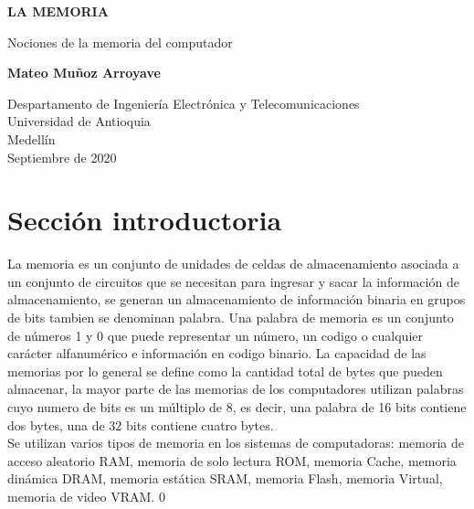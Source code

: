 \documentclass{article}
\begin{document}
\begin{titlepage}
    \begin{center}
        \vspace*{1cm}
            
        \Huge
        \textbf{LA MEMORIA }
            
        \vspace{0.5cm}
        \LARGE
        Nociones de la memoria del computador
            
        \vspace{1.5cm}
            
        \textbf{Mateo Muñoz Arroyave }
            
        \vfill
            
        \vspace{0.8cm}
            
        \Large
        Despartamento de Ingeniería Electrónica y Telecomunicaciones\\
        Universidad de Antioquia\\
        Medellín\\
        Septiembre de 2020
            
    \end{center}
\end{titlepage}

\tableofcontents

\section{Sección introductoria}La memoria es un conjunto de unidades de celdas de almacenamiento asociada a un conjunto de circuitos que se necesitan para ingresar y sacar la información de almacenamiento, se generan un almacenamiento de información binaria en grupos de bits tambien se denominan palabra. Una palabra de memoria es un conjunto de números 1 y 0 que puede representar un número, un codigo o cualquier carácter alfanumérico e información en codigo binario. La capacidad de las memorias por lo general se define como la cantidad total de bytes que pueden almacenar, la mayor parte de las memorias de los computadores utilizan palabras cuyo numero de bits es un múltiplo de 8, es decir, una palabra de 16 bits contiene dos bytes, una de 32 bits contiene cuatro bytes. \\
Se utilizan varios tipos de memoria en los sistemas de computadoras: memoria de acceso aleatorio RAM, memoria de solo lectura ROM, memoria Cache, memoria dinámica DRAM, memoria estática SRAM, memoria Flash, memoria Virtual, memoria de video VRAM.
0
\end{document}
